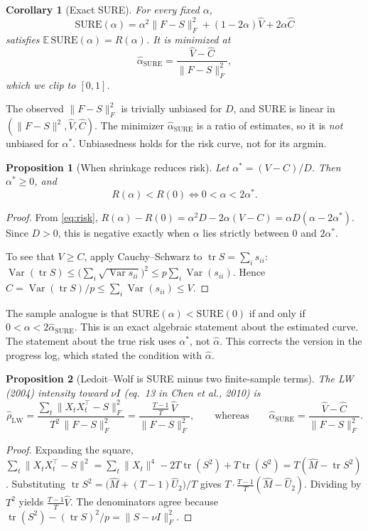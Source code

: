 \documentclass[11pt]{article}
\newtheorem{proposition}{Proposition}
\newtheorem{corollary}{Corollary}
\theoremstyle{remark}\newtheorem*{remark}{Remark}
\newcommand{\E}{\mathbb{E}}
\newcommand{\Var}{\operatorname{Var}}
\newcommand{\tr}{\operatorname{tr}}
\begin{document}
\begin{corollary}[Exact SURE]\label{cor:sure}
For every fixed $\alpha$,
\[
\mathrm{SURE}(\alpha)=\alpha^2\|F-S\|_F^2+(1-2\alpha)\hat V+2\alpha\hat C
\]
satisfies $\E\,\mathrm{SURE}(\alpha)=R(\alpha)$. It is minimized at
\[
\hat\alpha_{\mathrm{SURE}}=\frac{\hat V-\hat C}{\|F-S\|_F^2},
\]
which we clip to $[0,1]$.
\end{corollary}
The observed $\|F-S\|_F^2$ is trivially unbiased for $D$, and SURE is linear in
$(\|F-S\|^2,\hat V,\hat C)$. The minimizer $\hat\alpha_{\mathrm{SURE}}$ is a ratio of estimates, so it is
\emph{not} unbiased for $\alpha^*$. Unbiasedness holds for the risk curve, not for its argmin.

\begin{proposition}[When shrinkage reduces risk]\label{prop:reduce}
Let $\alpha^*=(V-C)/D$. Then $\alpha^*\ge 0$, and
\[
R(\alpha)<R(0)\iff 0<\alpha<2\alpha^* .
\]
\end{proposition}

\begin{proof}
From \eqref{eq:risk}, $R(\alpha)-R(0)=\alpha^2D-2\alpha(V-C)=\alpha D(\alpha-2\alpha^*)$. Since
$D>0$, this is negative exactly when $\alpha$ lies strictly between $0$ and $2\alpha^*$.

To see that $V\ge C$, apply Cauchy--Schwarz to $\tr S=\sum_i s_{ii}$:
$\Var(\tr S)\le\big(\sum_i\sqrt{\Var s_{ii}}\big)^2\le p\sum_i\Var(s_{ii})$. Hence
$C=\Var(\tr S)/p\le\sum_i\Var(s_{ii})\le V$.
\end{proof}

The sample analogue is that $\mathrm{SURE}(\alpha)<\mathrm{SURE}(0)$ if and only if
$0<\alpha<2\hat\alpha_{\mathrm{SURE}}$. This is an exact algebraic statement about the estimated curve.
The statement about the true risk uses $\alpha^*$, not $\hat\alpha$. This corrects the version in the
progress log, which stated the condition with $\hat\alpha$.

\begin{proposition}[Ledoit--Wolf is SURE minus two finite-sample terms]\label{prop:lw}
The LW (2004) intensity toward $\nu I$ (eq.~13 in Chen et al., 2010) is
\[
\hat\rho_{\mathrm{LW}}=\frac{\sum_t\|X_tX_t^\top-S\|_F^2}{T^2\,\|F-S\|_F^2}
=\frac{\tfrac{T-1}{T}\,\hat V}{\|F-S\|_F^2},
\qquad\text{whereas}\qquad
\hat\alpha_{\mathrm{SURE}}=\frac{\hat V-\hat C}{\|F-S\|_F^2}.
\]
\end{proposition}

\begin{proof}
Expanding the square,
$\sum_t\|X_tX_t^\top-S\|^2=\sum_t\|X_t\|^4-2T\tr(S^2)+T\tr(S^2)=T(\hat M-\tr S^2)$.
Substituting $\tr S^2=\big(\hat M+(T-1)\hat U_2\big)/T$ gives $T\cdot\frac{T-1}{T}(\hat M-\hat U_2)$.
Dividing by $T^2$ yields $\frac{T-1}{T}\hat V$. The denominators agree because
$\tr(S^2)-(\tr S)^2/p=\|S-\nu I\|_F^2$.
\end{proof}
\end{document}
